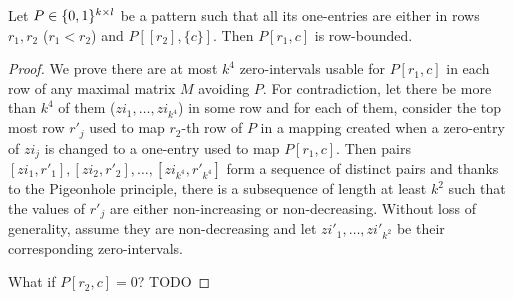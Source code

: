 \begin{lemma}
\label{lemma:cross}
Let $P\in\{0,1\}^{k\times l}$ be a pattern such that all its one-entries are either in rows $r_1,r_2$ ($r_1<r_2$) and $P[[r_2],\{c\}]$. Then $P[r_1,c]$ is row-bounded.
\end{lemma}
\begin{proof}
We prove there are at most $k^4$ zero-intervals usable for $P[r_1,c]$ in each row of any maximal matrix $M$ avoiding $P$. For contradiction, let there be more than $k^4$ of them ($zi_1,\dots,zi_{k^4}$) in some row and for each of them, consider the top most row $r'_j$ used to map $r_2$-th row of $P$ in a mapping created when a zero-entry of $zi_j$ is changed to a one-entry used to map $P[r_1,c]$. Then pairs $[zi_1,r'_1],[zi_2,r'_2],\dots,[zi_{k^4},r'_{k^4}]$ form a sequence of distinct pairs and thanks to the Pigeonhole principle, there is a subsequence of length at least $k^2$ such that the values of $r'_j$ are either non-increasing or non-decreasing. Without loss of generality, assume they are non-decreasing and let $zi'_1,\dots,zi'_{k^2}$ be their corresponding zero-intervals.

What if $P[r_2,c]=0$? TODO
\end{proof}

